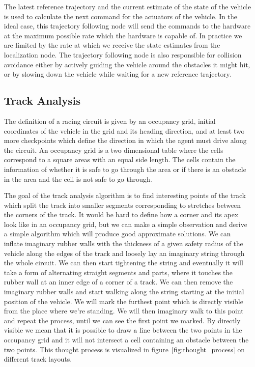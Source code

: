 The latest reference trajectory and the current estimate of the state of the vehicle is used to calculate the next command for the actuators of the vehicle. In the ideal case, this trajectory following node will send the commands to the hardware at the maximum possible rate which the hardware is capable of. In practice we are limited by the rate at which we receive the state estimates from the localization node. The trajectory following node is also responsible for collision avoidance either by actively guiding the vehicle around the obstacles it might hit, or by slowing down the vehicle while waiting for a new reference trajectory.

\subsection{Track Analysis}

The definition of a racing circuit is given by an occupancy grid, initial coordinates of the vehicle in the grid and its heading direction, and at least two more checkpoints which define the direction in which the agent must drive along the circuit. An occupancy grid is a two dimensional table where the cells correspond to a square areas with an equal side length. The cells contain the information of whether it is safe to go through the area or if there is an obstacle in the area and the cell is not safe to go through.

The goal of the track analysis algorithm is to find interesting points of the track which split the track into smaller segments corresponding to stretches between the corners of the track. It would be hard to define how a corner and its apex look like in an occupancy grid, but we can make a simple observation and derive a simple algorithm which will produce good approximate solutions. We can inflate imaginary rubber walls with the thickness of a given safety radius of the vehicle along the edges of the track and loosely lay an imaginary string through the whole circuit. We can then start tightening the string and eventually it will take a form of alternating straight segments and parts, where it touches the rubber wall at an inner edge of a corner of a track. We can then remove the imaginary rubber walls and start walking along the string starting at the initial position of the vehicle. We will mark the furthest point which is directly visible from the place where we're standing. We will then imaginary walk to this point and repeat the process, until we can see the first point we marked. By directly visible we mean that it is possible to draw a line between the two points in the occupancy grid and it will not intersect a cell containing an obstacle between the two points. This thought process is visualized in figure~\ref{fig:thought_process} on different track layouts.

